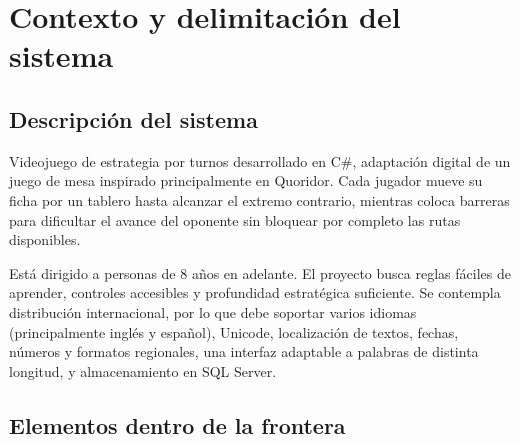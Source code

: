 \section{Contexto y delimitación del sistema}

\subsection{Descripción del sistema}

Videojuego de estrategia por turnos desarrollado en C\#, adaptación digital de un juego de mesa inspirado principalmente en Quoridor. Cada jugador mueve su ficha por un tablero hasta alcanzar el extremo contrario, mientras coloca barreras para dificultar el avance del oponente sin bloquear por completo las rutas disponibles.

Está dirigido a personas de 8 años en adelante. El proyecto busca reglas fáciles de aprender, controles accesibles y profundidad estratégica suficiente. Se contempla distribución internacional, por lo que debe soportar varios idiomas (principalmente inglés y español), Unicode, localización de textos, fechas, números y formatos regionales, una interfaz adaptable a palabras de distinta longitud, y almacenamiento en SQL Server.

\begin{center}
  
\end{center}

\subsection{Elementos dentro de la frontera}

